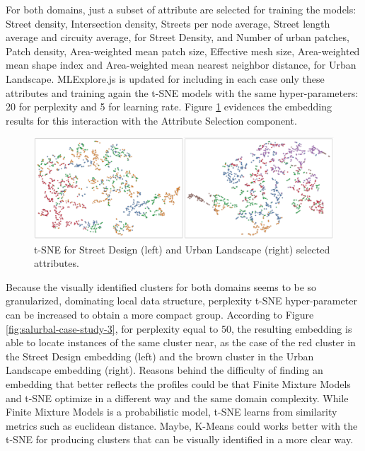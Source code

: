 For both domains, just a subset of attribute are selected for training the models: Street density, Intersection density, Streets per node average, Street length average and circuity average, for Street Density, and Number of urban patches, Patch density, Area-weighted mean patch size, Effective mesh size, Area-weighted mean shape index and Area-weighted mean nearest neighbor distance, for Urban Landscape. MLExplore.js is updated for including in each case only these attributes and training again the t-SNE models with the same hyper-parameters: 20 for perplexity and 5 for learning rate. Figure \ref{fig:salurbal-case-study-2} evidences the embedding results for this interaction with the Attribute Selection component.

\begin{figure}[ht]
 \centering
 \includegraphics[width=1.0\textwidth]{salurbal-case-study-2.png}
 \caption{t-SNE for Street Design (left) and Urban Landscape (right) selected attributes.}
 \label{fig:salurbal-case-study-2}
\end{figure}

Because the visually identified clusters for both domains seems to be so granularized, dominating local data structure, perplexity t-SNE hyper-parameter can be increased to obtain a more compact group. According to Figure \ref{fig:salurbal-case-study-3}, for perplexity equal to 50, the resulting embedding is able to locate instances of the same cluster near, as the case of the red cluster in the Street Design embedding (left) and the brown cluster in the Urban Landscape embedding (right). Reasons behind the difficulty of finding an embedding that better reflects the profiles could be that Finite Mixture Models and t-SNE optimize in a different way and the same domain complexity. While Finite Mixture Models is a probabilistic model, t-SNE learns from similarity metrics such as euclidean distance. Maybe, K-Means could works better with the t-SNE for producing clusters that can be visually identified in a more clear way.  

